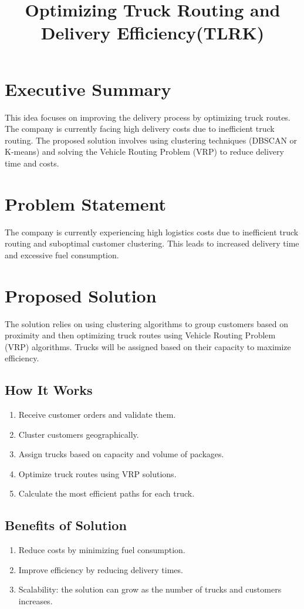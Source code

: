 \documentclass[a4paper,12pt, final]{article}
\title{Optimizing Truck Routing and Delivery Efficiency(TLRK)}
\begin{document}
\placelastupdatedtext
\maketitle

\section{Executive Summary}
This idea focuses on improving the delivery process by optimizing truck routes. The company is
currently facing high delivery costs due to inefficient truck routing.
The proposed solution involves using clustering techniques (DBSCAN or K-means) and solving the
Vehicle Routing Problem (VRP) to reduce delivery time and costs.

\section{Problem Statement}
The company is currently experiencing high logistics costs due to inefficient truck routing and
suboptimal customer clustering. This leads to increased delivery time and excessive fuel
consumption.

\section{Proposed Solution}
The solution relies on using clustering algorithms to group customers based on proximity and then
optimizing truck routes using Vehicle Routing Problem (VRP) algorithms. Trucks will be assigned
based on their capacity to maximize efficiency.

\subsection{How It Works}
\begin{enumerate}
    \item Receive customer orders and validate them.
    \item Cluster customers geographically.
    \item Assign trucks based on capacity and volume of packages.
    \item Optimize truck routes using VRP solutions.
    \item Calculate the most efficient paths for each truck.
\end{enumerate}
\subsection{Benefits of Solution}
\begin{enumerate}
    \item Reduce costs by minimizing fuel consumption.
    \item Improve efficiency by reducing delivery times.
    \item Scalability: the solution can grow as the number of trucks and customers increases.
\end{enumerate}
\end{document}
